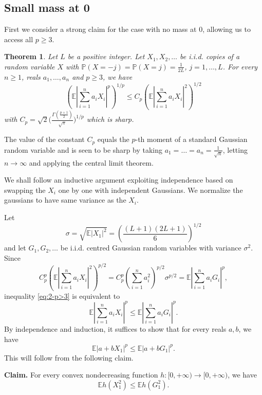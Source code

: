 \documentclass[10pt]{article}
\newcommand{\E}{\mathbb{E}}
\newcommand{\1}{\textbf{1}}
\newcommand{\p}[1]{\mathbb{P}\left( #1 \right)}
\newtheorem{theorem}{Theorem}[subsection]
\theoremstyle{remark}
\theoremstyle{definition}
\begin{document}
\subsection{Small mass at 0}

First we consider a strong claim for the case with no mass at 0, allowing us to access all $p \geq 3$. 

\begin{theorem}\label{thm:2-p>3}
Let $L$ be a positive integer. Let $X_1,X_2,\ldots$ be i.i.d. copies of a random variable $X$ with $\p{X = -j} = \p{X = j} = \frac{1}{2L}$, $j = 1, \ldots, L$. For every $n \geq 1$, reals $a_1,\ldots,a_n$ and $p \geq 3$, we have
\begin{equation}\label{eq:2-p>3}
\left(\E\left|\sum_{i=1}^n a_iX_i \right|^p\right)^{1/p} \leq C_p \left(\E\left|\sum_{i=1}^n a_iX_i \right|^2\right)^{1/2} 
\end{equation}
with $C_p = \sqrt{2} \Big(\frac{\Gamma (\frac{p+1}{2})}{\sqrt{\pi}} \Big)^{1/p}$ which is sharp.
\end{theorem}

The value of the constant $C_p$ equals the $p$-th moment of a standard Gaussian random variable and is seen to be sharp by taking $a_1 = \ldots = a_n = \frac{1}{\sqrt{n}}$, letting $n \to \infty$ and applying the central limit theorem.

We shall follow an inductive argument exploiting independence based on swapping the $X_i$ one by one with independent Gaussians. We normalize the gaussians to have same variance as the $X_i$. 

Let 
\begin{equation}\label{eq:def-sigma}
\sigma  = \sqrt{\E |X_1|^2} = \left(\frac{(L+1)(2L+1)}{6}\right)^{1/2}
\end{equation}
and let $G_1, G_2, \ldots$ be i.i.d. centred Gaussian random variables with variance $\sigma^2$. Since
\[
C_p^p\left(\E\left|\sum_{i=1}^n a_iX_i \right|^2\right)^{p/2} = C_p^p\left(\sum_{i=1}^n a_i^2\right)^{p/2}\sigma^{p/2} = \E\left|\sum_{i=1}^n a_iG_i \right|^p,
\]
inequality \eqref{eq:2-p>3} is equivalent to
\[
 \E\left|\sum_{i=1}^n a_iX_i \right|^p \leq  \E\left|\sum_{i=1}^n a_iG_i \right|^p.
\]
By independence and induction, it suffices to show that for every reals $a, b$, we have
\begin{equation}\label{eq:XvsG}
\E|a+bX_1|^p \leq \E|a+bG_1|^p.
\end{equation}
This will follow from the following claim.

\bigskip
\noindent\textbf{Claim.} For every convex nondecreasing function $h\colon [0,+\infty)\to [0,+\infty)$, we have 
\begin{equation}\label{eq:X^2vsG^2}
\E h(X_1^2) \leq \E h(G_1^2).
\end{equation}
\end{document}
